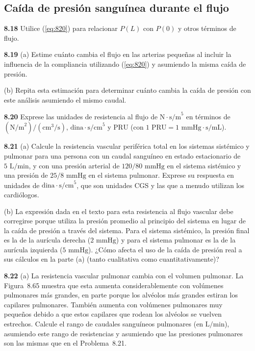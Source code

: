 \documentclass[12pt]{book}
\begin{document}
\subsection*{Caída de presión sanguínea durante el flujo}

\textbf{8.18} Utilice (\ref{eq:820}) para relacionar $P(L)$ con $P(0)$ y otros términos de flujo.

\textbf{8.19} (a) Estime cuánto cambia el flujo en las arterias pequeñas al incluir la influencia de la compliancia utilizando (\ref{eq:820}) y asumiendo la misma caída de presión.

(b) Repita esta estimación para determinar cuánto cambia la caída de presión con este análisis asumiendo el mismo caudal.

\textbf{8.20} Exprese las unidades de resistencia al flujo de $\text{N}\cdot\text{s/m}^5$ en términos de $(\text{N/m}^2)/(\text{cm}^3\text{/s})$, $\text{dina}\cdot\text{s/cm}^5$ y $\text{PRU}$ (con $1\text{ PRU} = 1\text{ mmHg}\cdot\text{s/mL}$).

\textbf{8.21} (a) Calcule la resistencia vascular periférica total en los sistemas sistémico y pulmonar para una persona con un caudal sanguíneo en estado estacionario de $5\text{ L/min}$, y con una presión arterial de $120/80\text{ mmHg}$ en el sistema sistémico y una presión de $25/8\text{ mmHg}$ en el sistema pulmonar. Exprese su respuesta en unidades de $\text{dina}\cdot\text{s/cm}^5$, que son unidades CGS y las que a menudo utilizan los cardiólogos.

(b) La expresión dada en el texto para esta resistencia al flujo vascular debe corregirse porque utiliza la presión promedio al principio del sistema en lugar de la caída de presión a través del sistema. Para el sistema sistémico, la presión final es la de la aurícula derecha ($2\text{ mmHg}$) y para el sistema pulmonar es la de la aurícula izquierda ($5\text{ mmHg}$). ¿Cómo afecta el uso de la caída de presión real a sus cálculos en la parte (a) (tanto cualitativa como cuantitativamente)?

\textbf{8.22} (a) La resistencia vascular pulmonar cambia con el volumen pulmonar. La Figura~8.65 muestra que esta aumenta considerablemente con volúmenes pulmonares más grandes, en parte porque los alvéolos más grandes estiran los capilares pulmonares. También aumenta con volúmenes pulmonares muy pequeños debido a que estos capilares que rodean los alvéolos se vuelven estrechos. Calcule el rango de caudales sanguíneos pulmonares (en $\text{L/min}$), asumiendo este rango de resistencias y asumiendo que las presiones pulmonares son las mismas que en el Problema~8.21.
\end{document}
